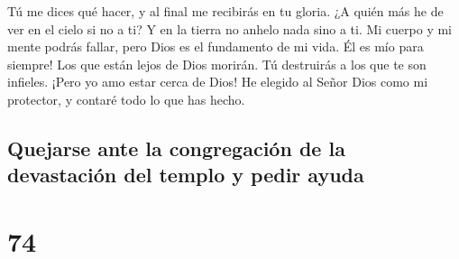  Tú me dices qué hacer, y al final me recibirás en tu
gloria.  ¿A quién más he de ver en el cielo si no a ti? Y
en la tierra no anhelo nada sino a ti.  Mi cuerpo y mi
mente podrás fallar, pero Dios es el fundamento de mi vida. Él es mío
para siempre!  Los que están lejos de Dios morirán. Tú
destruirás a los que te son infieles.  ¡Pero yo amo estar
cerca de Dios! He elegido al Señor Dios como mi protector, y contaré
todo lo que has hecho.

\hypertarget{quejarse-ante-la-congregaciuxf3n-de-la-devastaciuxf3n-del-templo-y-pedir-ayuda}{%
\subsection{Quejarse ante la congregación de la devastación del templo y
pedir
ayuda}\label{quejarse-ante-la-congregaciuxf3n-de-la-devastaciuxf3n-del-templo-y-pedir-ayuda}}

\hypertarget{section-73}{%
\section{74}\label{section-73}}

